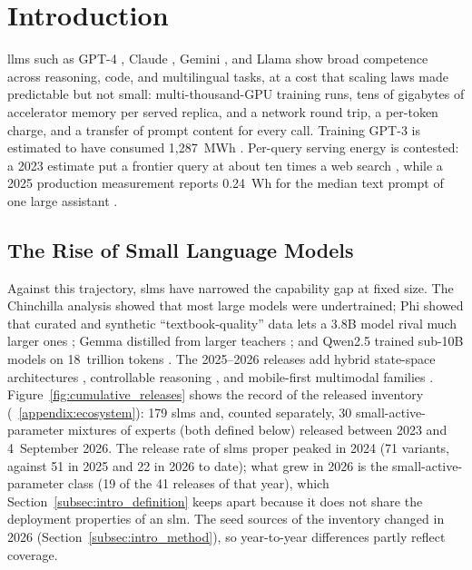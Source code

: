 \section{Introduction}
\label{section:introduction}

\Glspl{llm} such as GPT-4 \citep{openai2023gpt4}, Claude \citep{anthropic2024claude}, Gemini \citep{gemini2023}, and Llama \citep{grattafiori2024llama3} show broad competence across reasoning, code, and multilingual tasks, at a cost that scaling laws \citep{kaplan2020scaling,hoffmann2022chinchilla} made predictable but not small: multi-thousand-GPU training runs, tens of gigabytes of accelerator memory per served replica, and a network round trip, a per-token charge, and a transfer of prompt content for every call. Training GPT-3 is estimated to have consumed 1{,}287~MWh \citep{patterson2021carbon}. Per-query serving energy is contested: a 2023 estimate put a frontier query at about ten times a web search \citep{devries2023energy}, while a 2025 production measurement reports 0.24~Wh for the median text prompt of one large assistant \citep{elsworth2025google_energy}.

\subsection{The Rise of Small Language Models}
\label{subsec:intro_rise}

Against this trajectory, \glspl{slm} have narrowed the capability gap at fixed size. The Chinchilla analysis \citep{hoffmann2022chinchilla} showed that most large models were undertrained; Phi showed that curated and synthetic ``textbook-quality'' data lets a 3.8B model rival much larger ones \citep{abdin2024phi3}; Gemma distilled from larger teachers \citep{gemma2024}; and Qwen2.5 trained sub-10B models on 18~trillion tokens \citep{qwen2024qwen25}. The 2025--2026 releases add hybrid state-space architectures \citep{falconh1_2025}, controllable reasoning \citep{qwen3_2025}, and mobile-first multimodal families \citep{gemma4_2026,gunter2025afm}. Figure~\ref{fig:cumulative_releases} shows the record of the released inventory (\suppsec~\ref{appendix:ecosystem}): 179 \glspl{slm} and, counted separately, 30 small-active-parameter mixtures of experts (both defined below) released between 2023 and 4~September 2026. The release rate of \glspl{slm} proper peaked in 2024 (71 variants, against 51 in 2025 and 22 in 2026 to date); what grew in 2026 is the small-active-parameter class (19 of the 41 releases of that year), which Section~\ref{subsec:intro_definition} keeps apart because it does not share the deployment properties of an \gls{slm}. The seed sources of the inventory changed in 2026 (Section~\ref{subsec:intro_method}), so year-to-year differences partly reflect coverage.

